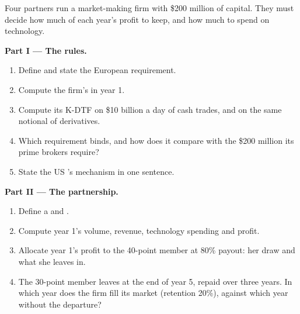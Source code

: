 \begin{problem}\label{pb:fm:the-proprietary-market-making-firm:1}
Four partners run a market-making firm with \$200 million of capital. They must decide how much of each year's profit to keep, and how much to
spend on technology.

\medskip\noindent\textbf{Part I --- The rules.}
\begin{enumerate}
\item Define  and state the European  requirement.
\item Compute the firm's  in year 1.
\item Compute its K-DTF on \$10 billion a day of cash trades, and on the same notional of derivatives.
\item Which requirement binds, and how does it compare with the \$200 million its prime brokers require?
\item State the US 's mechanism in one sentence.
\end{enumerate}

\medskip\noindent\textbf{Part II --- The partnership.}
\begin{enumerate}[resume]
\item Define a  and .
\item Compute year 1's volume, revenue, technology spending and profit.
\item Allocate year 1's profit to the 40-point member at 80\% payout: her draw and what she leaves in.
\item The 30-point member leaves at the end of year 5, repaid over three years. In which year does the firm fill its market (retention 20\%),
against which year without the departure?
\end{enumerate}


\end{problem}
